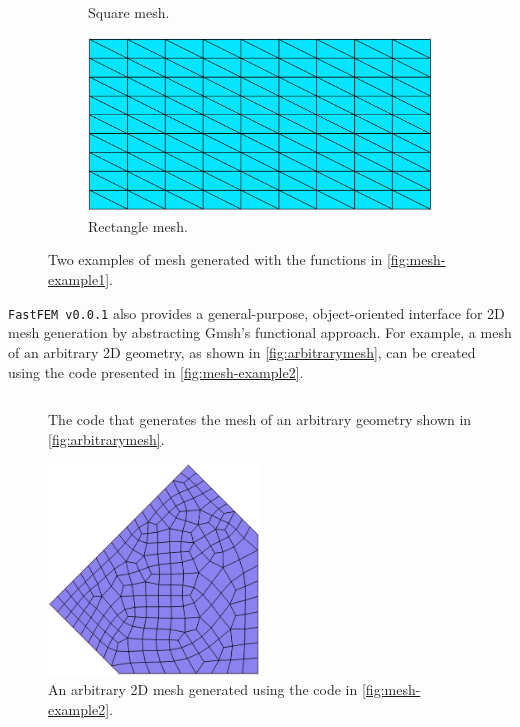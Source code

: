 \documentclass[headings=standardclasses, abstract=true]{scrartcl}
\newcommand{\pythonCodeBlock}[3]{%
    \begin{figure}
        \centering
        \begin{pythonbox}
            \inputminted[fontfamily=VSCode, baselinestretch=0.8]{python}{#1}
        \end{pythonbox}
        \caption{#2}
        \label{#3}
    \end{figure}
}
\begin{document}
\begin{figure}[H]
\begin{subfigure}[c]{0.4\textwidth}
        \caption{Square mesh.}
        \label{fig:square}
    \end{subfigure}
    \hspace{0.1\textwidth}
    \begin{subfigure}[c]{0.4\textwidth}
        \centering
        \includegraphics[width=\textwidth]{figures/rectangle_mesh.png}
        \caption{Rectangle mesh.}
        \label{fig:rectangle}
    \end{subfigure}
    \caption{Two examples of mesh generated with the functions in \autoref{fig:mesh-example1}.}
    \label{fig:mesh}
    \hfill
\end{figure}

\texttt{FastFEM v0.0.1} also provides a general-purpose, object-oriented interface for 2D mesh generation by abstracting Gmsh's functional approach. For example, a mesh of an arbitrary 2D geometry, as shown in \autoref{fig:arbitrarymesh}, can be created using the code presented in \autoref{fig:mesh-example2}.

\pythonCodeBlock{figures/mesher-example2.py}{The code that generates the mesh of an arbitrary geometry shown in \autoref{fig:arbitrarymesh}.}{fig:mesh-example2}

\begin{figure}[H]
    \centering
    \includegraphics[width=0.5\textwidth]{figures/arbitrary_mesh.png}
    \caption{An arbitrary 2D mesh generated using the code in \autoref{fig:mesh-example2}.}
    \label{fig:arbitrarymesh}
\end{figure}
\end{document}
